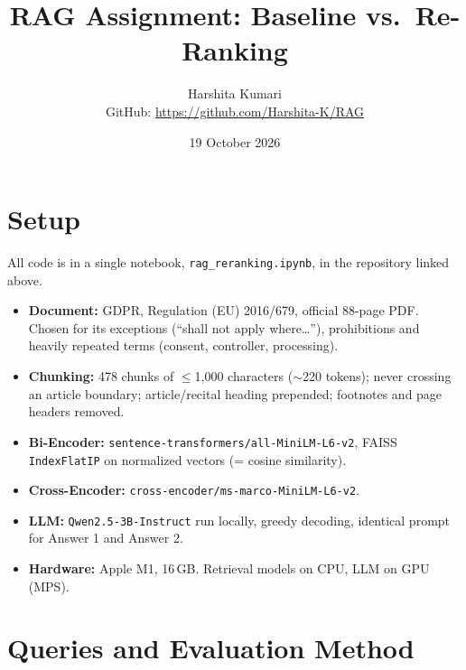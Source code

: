 \documentclass[11pt,a4paper]{article}
\title{RAG Assignment: Baseline vs.\ Re-Ranking}
\author{Harshita Kumari \\ \small GitHub: \url{https://github.com/Harshita-K/RAG}}
\date{19 October 2026}
\begin{document}
\maketitle

\section*{Setup}

All code is in a single notebook, \texttt{rag\_reranking.ipynb}, in the repository linked above.

\begin{itemize}
  \item \textbf{Document:} GDPR, Regulation (EU) 2016/679, official 88-page PDF. Chosen for its exceptions
        (``shall not apply where\ldots''), prohibitions and heavily repeated terms (consent, controller, processing).
  \item \textbf{Chunking:} 478 chunks of $\le$1,000 characters ($\sim$220 tokens); never crossing an article
        boundary; article/recital heading prepended; footnotes and page headers removed.
  \item \textbf{Bi-Encoder:} \texttt{sentence-transformers/all-MiniLM-L6-v2}, FAISS \texttt{IndexFlatIP} on
        normalized vectors (= cosine similarity).
  \item \textbf{Cross-Encoder:} \texttt{cross-encoder/ms-marco-MiniLM-L6-v2}.
  \item \textbf{LLM:} \texttt{Qwen2.5-3B-Instruct} run locally, greedy decoding, identical prompt for Answer 1 and Answer 2.
  \item \textbf{Hardware:} Apple M1, 16\,GB. Retrieval models on CPU, LLM on GPU (MPS).
\end{itemize}

\section*{Queries and Evaluation Method}
\end{document}
